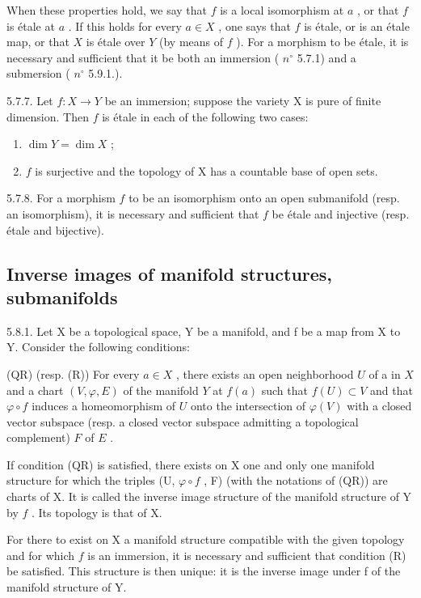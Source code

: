 When these properties hold, we say that \(f\) is a local isomorphism at \(a\) , or that \(f\) is étale at \(a\) . If this holds for every \(a \in X\) , one says that \(f\) is étale, or is an étale map, or that \(X\) is étale over \(Y\) (by means of \(f\) ). For a morphism to be étale, it is necessary and sufficient that it be both an immersion ( \(n^{\circ}\) 5.7.1) and a submersion ( \(n^{\circ}\) 5.9.1.).

5.7.7. Let \(f:X\to Y\) be an immersion; suppose the variety X is pure of finite dimension. Then \(f\) is étale in each of the following two cases:

\begin{enumerate}
\def\labelenumi{(\roman{enumi})}
\item
  \(\dim Y = \dim X\) ;
\item
  \(f\) is surjective and the topology of X has a countable base of open sets.
\end{enumerate}

5.7.8. For a morphism \(f\) to be an isomorphism onto an open submanifold (resp. an isomorphism), it is necessary and sufficient that \(f\) be étale and injective (resp. étale and bijective).

\subsection{Inverse images of manifold structures, submanifolds}

5.8.1. Let X be a topological space, Y be a manifold, and f be a map from X to Y. Consider the following conditions:

(QR) (resp. (R)) For every \(a \in X\) , there exists an open neighborhood \(U\) of a in \(X\) and a chart \((V, \varphi, E)\) of the manifold \(Y\) at \(f(a)\) such that \(f(U) \subset V\) and that \(\varphi \circ f\) induces a homeomorphism of \(U\) onto the intersection of \(\varphi(V)\) with a closed vector subspace (resp. a closed vector subspace admitting a topological complement) \(F\) of \(E\) .

If condition (QR) is satisfied, there exists on X one and only one manifold structure for which the triples (U, \(\varphi \circ f\) , F) (with the notations of (QR)) are charts of X. It is called the inverse image structure of the manifold structure of Y by \(f\) . Its topology is that of X.

For there to exist on X a manifold structure compatible with the given topology and for which \(f\) is an immersion, it is necessary and sufficient that condition (R) be satisfied. This structure is then unique: it is the inverse image under f of the manifold structure of Y.

